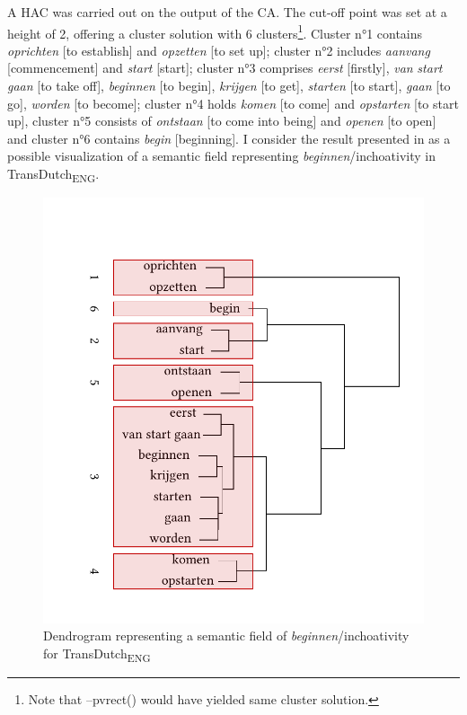 A HAC was carried out on the output of the CA. The cut-off point was set at a height of 2, offering a cluster solution with 6 clusters\footnote{Note that –pvrect() would have yielded same cluster solution.}. Cluster n°1 contains \textit{oprichten} [to establish] and \textit{opzetten} [to set up]; cluster n°2 includes \textit{aanvang} [commencement] and \textit{start} [start]; cluster n°3 comprises \textit{eerst} [firstly], \textit{van} \textit{start} \textit{gaan} [to take off], \textit{beginnen} [to begin], \textit{krijgen} [to get], \textit{starten} [to start], \textit{gaan} [to go], \textit{worden} [to become]; cluster n°4 holds \textit{komen} [to come] and \textit{opstarten} [to start up], cluster n°5 consists of \textit{ontstaan} [to come into being] and \textit{openen} [to open] and cluster n°6 contains \textit{begin} [beginning]. I consider the result presented in  as a possible visualization of a semantic field representing \textit{beginnen}/inchoativity in TransDutch\textsubscript{ENG}.

\begin{figure}
\includegraphics[width=\textwidth]{figures/tree65.pdf}
\caption{\label{fig:4:64}  Dendrogram representing a semantic field of \textit{beginnen}/inchoativity for TransDutch\textsubscript{ENG}}
\end{figure}

